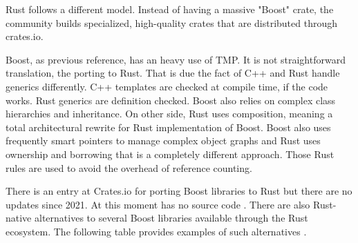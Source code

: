 Rust follows a different model. Instead of having a massive "Boost" crate, the community builds specialized, high-quality crates 
that are distributed through crates.io. 

Boost, as previous reference, has an heavy use of \gls{TMP}. It is not straightforward translation, the porting to Rust. 
That is due the fact of C++ and Rust handle generics differently. C++ templates are checked at compile time, if the code works. 
Rust generics are definition checked. Boost also relies on complex class hierarchies and inheritance. On other side, Rust uses 
composition, meaning a total architectural rewrite for Rust implementation of Boost. 
Boost also uses frequently smart pointers to manage complex object graphs and Rust uses ownership and borrowing that is a 
completely different approach. Those Rust rules are used to avoid the overhead of reference counting.

There is an entry at Crates.io for porting Boost libraries to Rust but there are no updates since 2021. 
At this moment has no source code \parencite{boosters_crate}.
There are also Rust-native alternatives to several Boost libraries available through the Rust ecosystem. The following table provides examples of such alternatives \parencite{crates_io}.

